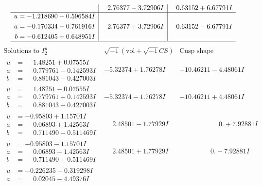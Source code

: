 \documentclass[1p]{elsarticle_modified}
\theoremstyle{definition}
\newcommand{\I}{\sqrt{-1}}
\begin{document}
$$\begin{array}{c|c|c}
 & \phantom{-}2.76377 - 3.72906 I & \phantom{-}0.63152 + 6.67791 I \\ \hline\begin{aligned}
u &= -1.218690 - 0.596584 I \\
a &= -0.170334 - 0.761916 I \\
b &= -0.612405 + 0.648951 I\end{aligned}
 & \phantom{-}2.76377 + 3.72906 I & \phantom{-}0.63152 - 6.67791 I\\
 \hline 
 \end{array}$$\newpage$$\begin{array}{c|c|c}  
\text{Solutions to }I^u_{2}& \I (\text{vol} + \sqrt{-1}CS) & \text{Cusp shape}\\
 \hline 
\begin{aligned}
u &= \phantom{-}1.48251 + 0.07555 I \\
a &= \phantom{-}0.779761 - 0.142593 I \\
b &= \phantom{-}0.881043 - 0.427003 I\end{aligned}
 & -5.32374 + 1.76278 I & -10.46211 - 4.48061 I \\ \hline\begin{aligned}
u &= \phantom{-}1.48251 - 0.07555 I \\
a &= \phantom{-}0.779761 + 0.142593 I \\
b &= \phantom{-}0.881043 + 0.427003 I\end{aligned}
 & -5.32374 - 1.76278 I & -10.46211 + 4.48061 I \\ \hline\begin{aligned}
u &= -0.95803 + 1.15701 I \\
a &= \phantom{-}0.06893 + 1.42563 I \\
b &= \phantom{-}0.711490 - 0.511469 I\end{aligned}
 & \phantom{-}2.48501 - 1.77929 I & \phantom{-0.000000 -}0. + 7.92881 I \\ \hline\begin{aligned}
u &= -0.95803 - 1.15701 I \\
a &= \phantom{-}0.06893 - 1.42563 I \\
b &= \phantom{-}0.711490 + 0.511469 I\end{aligned}
 & \phantom{-}2.48501 + 1.77929 I & \phantom{-0.000000 } 0. - 7.92881 I \\ \hline\begin{aligned}
u &= -0.226235 + 0.319298 I \\
a &= \phantom{-}0.02045 - 4.49376 I \\

\end{aligned}
\end{array}$$
\end{document}
